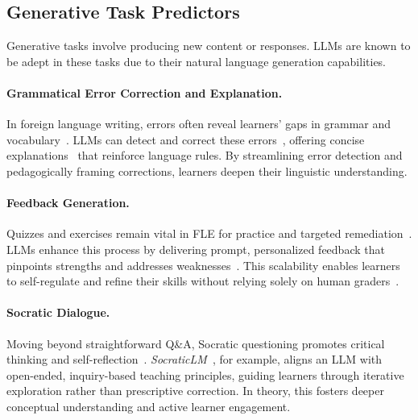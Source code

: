 

\subsection{Generative Task Predictors}
Generative tasks involve producing new content or responses. LLMs are known to be adept in these tasks due to their natural language generation capabilities.

\paragraph{Grammatical Error Correction and Explanation.} In foreign language writing, errors often reveal learners’ gaps in grammar and vocabulary~\cite{hyland2006feedback}. LLMs can detect and correct these errors~\cite{bryant2023grammatical,ye-etal-2023-mixedit}, offering concise explanations~\cite{ye2024excgec} that reinforce language rules. By streamlining error detection and pedagogically framing corrections, learners deepen their linguistic understanding.

\paragraph{Feedback Generation.} Quizzes and exercises remain vital in FLE for practice and targeted remediation~\cite{rashov2024modern}. LLMs enhance this process by delivering prompt, personalized feedback that pinpoints strengths and addresses weaknesses~\cite{borges-etal-2024-teach}. This scalability enables learners to self-regulate and refine their skills without relying solely on human graders~\cite{stamper2024enhancing}.

\paragraph{Socratic Dialogue.} Moving beyond straightforward Q\&A, Socratic questioning promotes critical thinking and self-reflection~\cite{paul2007critical}. \textit{SocraticLM}~\cite{liusocraticlm}, for example, aligns an LLM with open-ended, inquiry-based teaching principles, guiding learners through iterative exploration rather than prescriptive correction. In theory, this fosters deeper conceptual understanding and active learner engagement.

